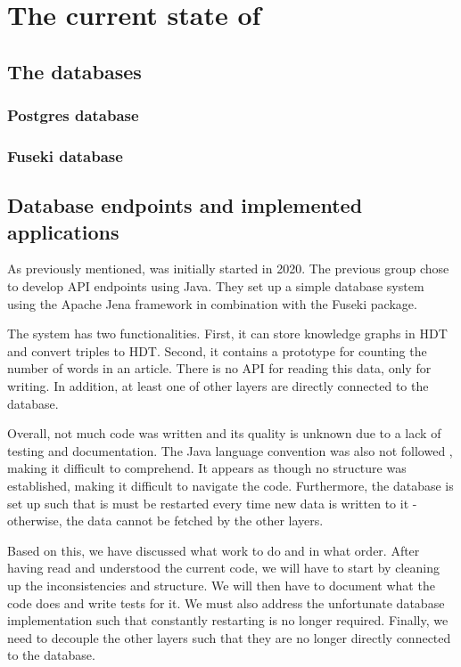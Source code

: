 \section{The current state of \knox{}}

\subsection{The \knox{} databases}
\subsubsection*{Postgres database}
\subsubsection*{Fuseki database}
\subsection{Database endpoints and implemented applications}


As previously mentioned, \knox{} was initially started in 2020.
The previous group chose to develop API endpoints using Java.
They set up a simple database system using the Apache Jena framework in combination with the Fuseki package.

The system has two functionalities. 
First, it can store knowledge graphs in HDT and convert triples to HDT.
Second, it contains a prototype for counting the number of words in an article.
There is no API for reading this data, only for writing. 
In addition, at least one of other layers are directly connected to the database.

Overall, not much code was written and its quality is unknown due to a lack of testing and documentation.
The Java language convention was also not followed \cite{java_convention}, making it difficult to comprehend.
It appears as though no structure was established, making it difficult to navigate the code. 
Furthermore, the database is set up such that is must be restarted every time new data is written to it - otherwise, the data cannot be fetched by the other layers.

Based on this, we have discussed what work to do and in what order.
After having read and understood the current code, we will have to start by cleaning up the inconsistencies and structure.
We will then have to document what the code does and write tests for it.
We must also address the unfortunate database implementation such that constantly restarting is no longer required.
Finally, we need to decouple the other layers such that they are no longer directly connected to the database.

